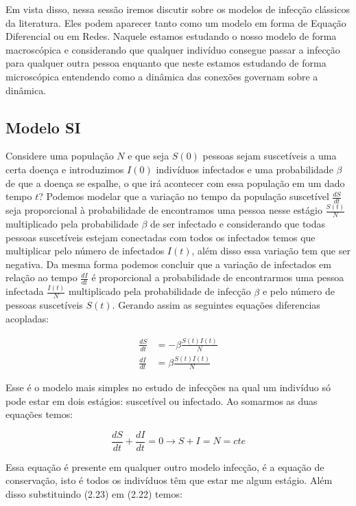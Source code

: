 Em vista disso, nessa sessão iremos discutir sobre os modelos de infecção clássicos da literatura. Eles podem aparecer tanto como um modelo em forma de Equação Diferencial ou em Redes. Naquele estamos estudando o nosso modelo de forma macroscópica e considerando que qualquer indivíduo consegue passar a infecção para qualquer outra pessoa enquanto que neste estamos estudando de forma microscópica entendendo como a dinâmica das conexões governam sobre a dinâmica.

\subsection{Modelo SI}

Considere uma população $N$ e que seja $S(0)$ pessoas sejam suscetíveis a uma certa doença e introduzimos $I(0)$ indivíduos infectados e uma probabilidade $\beta$ de que a doença se espalhe, o que irá acontecer com essa população em um dado tempo $t$? Podemos modelar que a variação no tempo da população suscetível $\frac{dS}{dt}$ seja proporcional à probabilidade de encontramos uma pessoa nesse estágio $\frac{S(t)}{N}$ multiplicado pela probabilidade $\beta$ de ser infectado e considerando que todas pessoas suscetíveis estejam conectadas com todos os infectados temos que multiplicar pelo número de infectados $I(t)$, além disso essa variação tem que ser negativa. Da mesma forma podemos concluir que a variação de infectados em relação ao tempo $\frac{dI}{dt}$ é proporcional a probabilidade de encontrarmos uma pessoa infectada $\frac{I(t)}{N}$ multiplicado pela probabilidade de infecção $\beta$ e pelo número de pessoas suscetíveis $S(t)$. Gerando assim as seguintes equações diferencias acopladas:

\begin{align}
  \frac{dS}{dt} &= -\beta\frac{S(t)I(t)}{N}\\
  \frac{dI}{dt} &= \beta\frac{S(t)I(t)}{N}
\end{align}

Esse é o modelo mais simples no estudo de infecções na qual um indivíduo só pode estar em dois estágios: suscetível ou infectado. Ao somarmos as duas equações temos:

\begin{equation}
  \frac{dS}{dt} + \frac{dI}{dt} = 0 \rightarrow S + I = N =cte
\end{equation}

Essa equação é presente em qualquer outro modelo infecção, é a equação de conservação, isto é todos os indivíduos têm que estar me algum estágio. Além disso substituindo (2.23) em (2.22) temos:

